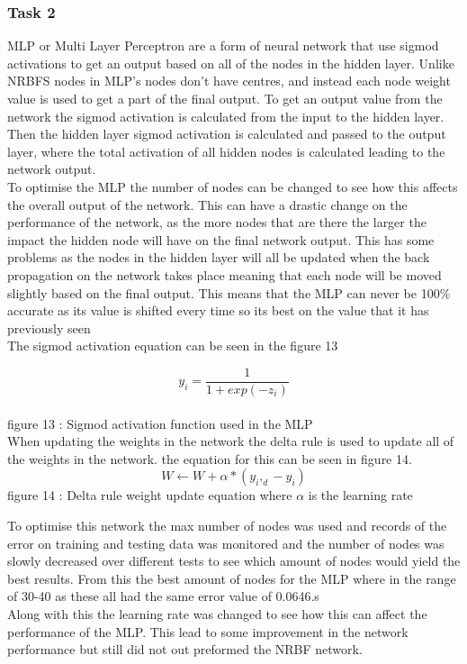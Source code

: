 \documentclass{IEEEtran}[11pt]
\begin{document}
\subsubsection{Task 2}
\begin{flushleft}
  MLP or Multi Layer Perceptron are a form of neural network that use sigmod activations
  to get an output based on all of the nodes in the hidden layer. Unlike NRBFS nodes in
  MLP's nodes don't have centres, and instead each node weight value is used to get a
  part of the final output. To get an output value from the network the sigmod activation
  is calculated from the input to the hidden layer. Then the hidden layer sigmod activation
  is calculated and passed to the output layer, where the total activation of all hidden
  nodes is calculated leading to the network output.
  \\
  \vspace{1.5mm}
  To optimise the MLP the number of nodes can be changed to see how this affects the overall
  output of the network. This can have a drastic change on the performance of the network, as
  the more nodes that are there the larger the impact the hidden node will have on the final
  network output. This has some problems as the nodes in the hidden layer will all be updated
  when the back propagation on the network takes place meaning that each node will be moved
  slightly based on the final output. This means that the MLP can never be 100\% accurate
  as its value is shifted every time so its best on the value that it has previously seen
  \\
  \vspace{1.5mm}
  The sigmod activation equation can be seen in the figure 13

  $$y_i=\frac{1}{1+exp(-z_i)}$$
  \\
  \vspace{1.5mm}
  {\footnotesize figure 13 : Sigmod activation function used in the MLP}
  \\
  \vspace{1.5mm}
  When updating the weights in the network the delta rule is used to update all of
  the weights in the network. the equation for this can be seen in figure 14.
  $$W \leftarrow W  + \alpha*(y_i,_d - y_i)$$
  {\footnotesize figure 14 : Delta rule weight update equation where $\alpha$ is the learning
  rate}
  \\
  \vspace{1.5mm}

  To optimise this network the max number of nodes was used and records of the error on training
  and testing data was monitored and the number of nodes was slowly decreased over different tests
  to see which amount of nodes would yield the best results. From this the best amount of nodes
  for the MLP where in the range of 30-40 as these all had the same error value of 0.0646.s
  \\
  \vspace{1.5mm}
  Along with this the learning rate was changed to see how this can affect the
  performance of the MLP. This lead to some improvement in the network performance
  but still did not out preformed the NRBF network.


\end{flushleft}
\end{document}
